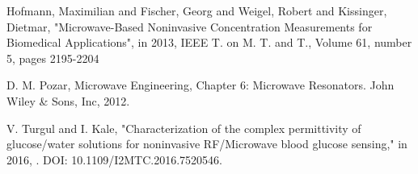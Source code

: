 \documentclass[10pt,final,conference,a4paper,twocolumn]{IEEEtran_AntennEMB_GigaHertz2016}
\begin{document}



%
%


\begin{thebibliography}{99}
	
	
	
	 Hofmann, Maximilian and Fischer, Georg and Weigel, Robert and Kissinger, Dietmar, "Microwave-Based Noninvasive Concentration Measurements for Biomedical Applications", in 2013, IEEE T. on M. T. and T., Volume 61, number 5, pages 2195-2204
	
	 D. M. Pozar, Microwave Engineering, Chapter 6: Microwave Resonators. John Wiley \& Sons,
	Inc, 2012.
	
	 V. Turgul and I. Kale, "Characterization of the complex permittivity of glucose/water solutions for noninvasive RF/Microwave blood glucose sensing," in 2016, . DOI: 10.1109/I2MTC.2016.7520546.
\end{thebibliography}


\end{document}
